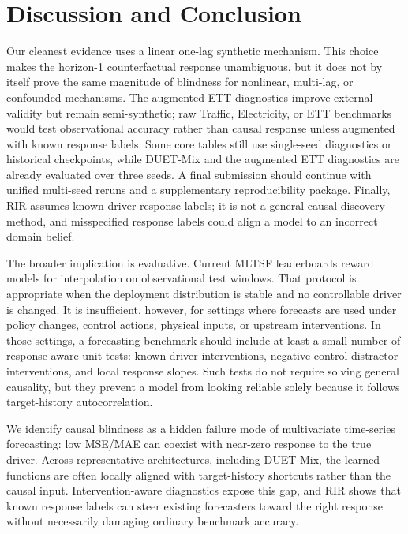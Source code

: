 \documentclass{article}
\begin{document}
\section{Discussion and Conclusion}
\label{sec:limitations}

Our cleanest evidence uses a linear one-lag synthetic mechanism. This choice makes
the horizon-1 counterfactual response unambiguous, but it does not by itself prove
the same magnitude of blindness for nonlinear, multi-lag, or confounded mechanisms.
The augmented ETT diagnostics improve external validity but remain semi-synthetic;
raw Traffic, Electricity, or ETT benchmarks would test observational accuracy
rather than causal response unless augmented with known response labels. Some core
tables still use single-seed diagnostics or historical checkpoints, while DUET-Mix
and the augmented ETT diagnostics are already evaluated over three seeds. A final
submission should continue
with unified multi-seed reruns and a supplementary reproducibility package.
Finally, RIR assumes known driver-response labels; it is not a general causal
discovery method, and misspecified response labels could align a model to an
incorrect domain belief.

The broader implication is evaluative. Current MLTSF leaderboards reward models for
interpolation on observational test windows. That protocol is appropriate when the
deployment distribution is stable and no controllable driver is changed. It is
insufficient, however, for settings where forecasts are used under policy changes,
control actions, physical inputs, or upstream interventions. In those settings, a
forecasting benchmark should include at least a small number of response-aware unit
tests: known driver interventions, negative-control distractor interventions, and
local response slopes. Such tests do not require solving general causality, but they
prevent a model from looking reliable solely because it follows target-history
autocorrelation.

We identify causal blindness as a hidden failure mode of multivariate time-series
forecasting: low MSE/MAE can coexist with near-zero response to the true driver.
Across representative architectures, including DUET-Mix, the learned functions are
often locally aligned with target-history shortcuts rather than the causal input.
Intervention-aware diagnostics expose this gap, and RIR shows that known response
labels can steer existing forecasters toward the right response without necessarily
damaging ordinary benchmark accuracy.
\end{document}
